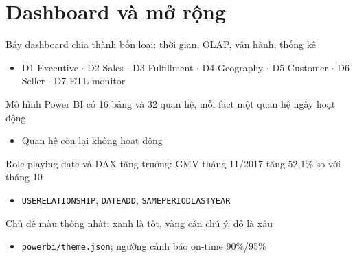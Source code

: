 \section[Dashboard và mở rộng]{Dashboard và mở rộng}

\begin{frame}{Bảy dashboard chia thành bốn loại: thời gian, OLAP, vận hành, thống kê}
\begin{itemize}
  \item D1 Executive $\cdot$ D2 Sales $\cdot$ D3 Fulfillment $\cdot$ D4 Geography $\cdot$ D5 Customer $\cdot$ D6 Seller $\cdot$ D7 ETL monitor
\end{itemize}

\end{frame}

\begin{frame}{Mô hình Power BI có 16 bảng và 32 quan hệ, mỗi fact một quan hệ ngày hoạt động}
\begin{itemize}
  \item Quan hệ còn lại không hoạt động
\end{itemize}

\end{frame}

\begin{frame}{Role-playing date và DAX tăng trưởng: GMV tháng 11/2017 tăng 52,1\% so với tháng 10}
\begin{itemize}
  \item \texttt{USERELATIONSHIP}, \texttt{DATEADD}, \texttt{SAMEPERIODLASTYEAR}
\end{itemize}

\end{frame}

\begin{frame}{Chủ đề màu thống nhất: xanh là tốt, vàng cần chú ý, đỏ là xấu}
\begin{itemize}
  \item \texttt{powerbi/theme.json}; ngưỡng cảnh báo on-time 90\%/95\%
\end{itemize}

\end{frame}

